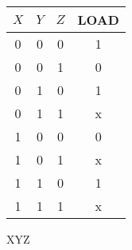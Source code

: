   \begin{figure}[H]
    \begin{subfigure}{0.49\textwidth}
      \centering
      \begin{tabular}{c c c | c}
        \toprule
        $X$ & $Y$ & $Z$ & LOAD \\ \midrule
        0     & 0     & 0   & 1 \\
        0     & 0     & 1   & 0 \\
        0     & 1     & 0   & 1 \\
        0     & 1     & 1   & x \\
        1     & 0     & 0   & 0 \\
        1     & 0     & 1   & x \\
        1     & 1     & 0   & 1 \\
        1     & 1     & 1   & x \\
        \bottomrule
      \end{tabular}
    \end{subfigure}
    \begin{subfigure}{0.49\textwidth}
      \centering
      \begin{Karnaughvuit}{X}{Y}{Z}
      \end{Karnaughvuit}
    \end{subfigure}
  \end{figure}
